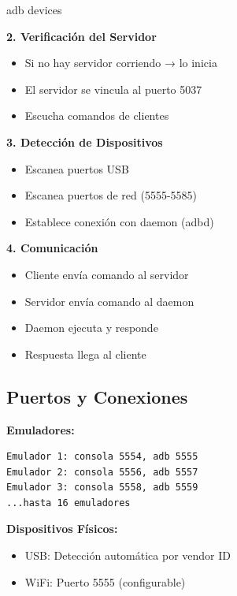 \documentclass[
  doc,
  floatsintext,
  longtable,
  a4paper,
  nolmodern,
  notxfonts,
  notimes,
  12pt,
  colorlinks=true,linkcolor=blue,citecolor=blue,urlcolor=blue]{apa7}
\newenvironment{Shaded}{\begin{snugshade}}{\end{snugshade}}
\newcommand{\ExtensionTok}[1]{\textcolor[rgb]{0.00,0.23,0.31}{#1}}
\newcommand{\NormalTok}[1]{\textcolor[rgb]{0.00,0.23,0.31}{#1}}
\providecommand{\tightlist}{%
  \setlength{\itemsep}{0pt}\setlength{\parskip}{0pt}}
\begin{document}
\begin{Shaded}
\begin{Highlighting}[]
\ExtensionTok{adb}\NormalTok{ devices}
\end{Highlighting}
\end{Shaded}

\textbf{2. Verificación del Servidor}

\begin{itemize}
\tightlist
\item
  Si no hay servidor corriendo → lo inicia
\item
  El servidor se vincula al puerto 5037
\item
  Escucha comandos de clientes
\end{itemize}

\textbf{3. Detección de Dispositivos}

\begin{itemize}
\tightlist
\item
  Escanea puertos USB
\item
  Escanea puertos de red (5555-5585)
\item
  Establece conexión con daemon (adbd)
\end{itemize}

\textbf{4. Comunicación}

\begin{itemize}
\tightlist
\item
  Cliente envía comando al servidor
\item
  Servidor envía comando al daemon
\item
  Daemon ejecuta y responde
\item
  Respuesta llega al cliente
\end{itemize}

\subsection{Puertos y Conexiones}\label{puertos-y-conexiones}

\textbf{Emuladores:}

\begin{verbatim}
Emulador 1: consola 5554, adb 5555
Emulador 2: consola 5556, adb 5557
Emulador 3: consola 5558, adb 5559
...hasta 16 emuladores
\end{verbatim}

\textbf{Dispositivos Físicos:}

\begin{itemize}
\tightlist
\item
  USB: Detección automática por vendor ID
\item
  WiFi: Puerto 5555 (configurable)
\end{itemize}
\end{document}
